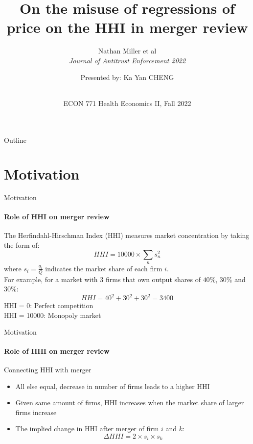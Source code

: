 \documentclass{beamer}
\title{On the misuse of regressions of price on
the HHI in merger review}
\subtitle{Nathan Miller et al\\ \textit{Journal of Antitrust Enforcement 2022}}
\author{Presented by: Ka Yan CHENG}
\date{ \vspace*{-1cm}\\ ECON 771 Health Economics II, Fall 2022}
\begin{document}
\begin{frame}
    \titlepage 
\end{frame}

\logo{}


\begin{frame}{Outline}
    \tableofcontents
\end{frame}


\section{Motivation}

\begin{frame}{Motivation}
\framesubtitle{Role of HHI on merger review}
The Herfindahl-Hirschman Index (HHI) measures market concentration by taking the form of:\\
\begin{equation*}
HHI = 10000 \times \sum_n s_n^2
\end{equation*}
where $s_i = \frac{q_i}{Q}$ indicates the market share of each firm $i$.\\
\hfill \break
For example, for  a market with 3 firms that own output shares of $40\%$, $30\%$ and $30\%$:
\begin{equation*}
HHI = 40^2 + 30^2 + 30^2 = 3400 
\end{equation*}
HHI = 0: Perfect competition\\
HHI = 10000: Monopoly market
\end{frame}

\begin{frame}{Motivation}
\framesubtitle{Role of HHI on merger review}
Connecting HHI with merger
\begin{itemize}
\item All else equal, decrease in number of firms leads to a higher HHI
\item Given same amount of firms, HHI increases when the market share of larger firms increase
\item The implied change in HHI after merger of firm $i$ and $k$:
$$\Delta HHI  = 2 \times s_i \times s_k$$
\end{itemize}
\end{frame}
\end{document}

